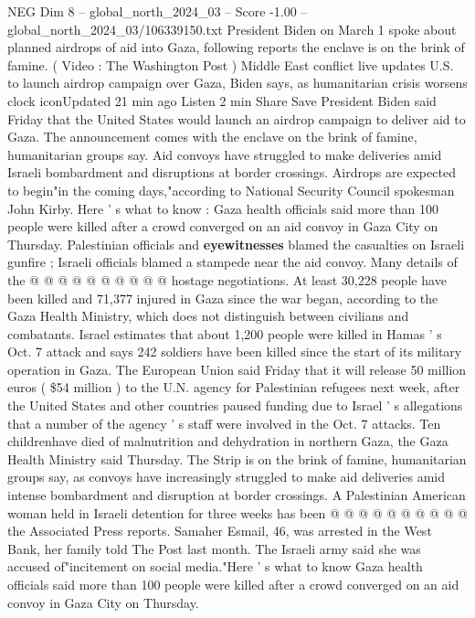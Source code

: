 \begin{textsample}{NEG Dim 8 – global\_north\_2024\_03 – Score -1.00 – global\_north\_2024\_03/106339150.txt}  \label{ex:f8_neg_439}
President Biden on March 1 spoke about planned airdrops of aid into Gaza, following reports the enclave is on the brink of famine. ( Video : The Washington Post ) Middle East conflict live updates U.S. to launch airdrop campaign over Gaza, Biden says, as humanitarian crisis worsens clock iconUpdated 21 min ago Listen 2 min Share Save President Biden said Friday that the United States would launch an airdrop campaign to deliver aid to Gaza.
The announcement comes with the enclave on the brink of famine, humanitarian groups say.
Aid convoys have struggled to make deliveries amid Israeli bombardment and disruptions at border crossings.
Airdrops are expected to begin"in the coming days,"according to National Security Council spokesman John Kirby.
Here ' s what to know : Gaza health officials said more than 100 people were killed after a crowd converged on an aid convoy in Gaza City on Thursday.
Palestinian officials and \textbf{eyewitnesses} blamed the casualties on Israeli gunfire ; Israeli officials blamed a stampede near the aid convoy.
Many details of the @ @ @ @ @ @ @ @ @ @ hostage negotiations.
At least 30,228 people have been killed and 71,377 injured in Gaza since the war began, according to the Gaza Health Ministry, which does not distinguish between civilians and combatants.
Israel estimates that about 1,200 people were killed in Hamas ' s Oct. 7 attack and says 242 soldiers have been killed since the start of its military operation in Gaza.
The European Union said Friday that it will release 50 million euros ( \$54 million ) to the U.N. agency for Palestinian refugees next week, after the United States and other countries paused funding due to Israel ' s allegations that a number of the agency ' s staff were involved in the Oct. 7 attacks.
Ten childrenhave died of malnutrition and dehydration in northern Gaza, the Gaza Health Ministry said Thursday.
The Strip is on the brink of famine, humanitarian groups say, as convoys have increasingly struggled to make aid deliveries amid intense bombardment and disruption at border crossings.
A Palestinian American woman held in Israeli detention for three weeks has been @ @ @ @ @ @ @ @ @ @ the Associated Press reports.
Samaher Esmail, 46, was arrested in the West Bank, her family told The Post last month.
The Israeli army said she was accused of"incitement on social media."Here ' s what to know Gaza health officials said more than 100 people were killed after a crowd converged on an aid convoy in Gaza City on Thursday.

\end{textsample}
